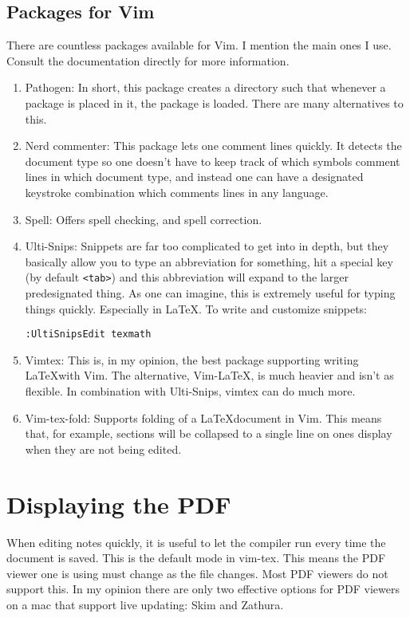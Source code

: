 \documentclass{amsart}
\begin{document}
\subsection{Packages for Vim}

There are countless packages available for Vim. I mention the main ones I use. Consult the
documentation directly for more information.
\begin{enumerate}
\item Pathogen: In short, this package creates a directory such that whenever a package is
placed in it, the package is loaded. There are many alternatives to this. 
\item Nerd commenter: This package lets one comment lines quickly. It detects the document
type so one doesn't have to keep track of which symbols comment lines in which document
type, and instead one can have a designated keystroke combination which comments lines in
any language. 
\item Spell: Offers spell checking, and spell correction.
\item Ulti-Snips: Snippets are far too complicated to get into in depth, but they
basically allow you to type an abbreviation for something, hit a special key (by default
\texttt{<tab>}) and this abbreviation will expand to the larger predesignated thing. As
one can imagine, this is extremely useful for typing things quickly. Especially in \LaTeX.
To write and customize snippets:
\begin{verbatim}
:UltiSnipsEdit texmath
\end{verbatim}
\item Vimtex: This is, in my opinion, the best package supporting writing \LaTeX with Vim.
The alternative, Vim-LaTeX, is much heavier and isn't as flexible. In combination with
Ulti-Snips, vimtex can do much more. 
\item Vim-tex-fold: Supports folding of a \LaTeX document in Vim. This means that, for
example, sections will be collapsed to a single line on ones display when they are not
being edited. 
\end{enumerate}

\section{Displaying the PDF}

When editing notes quickly, it is useful to let the compiler run every time the document
is saved. This is the default mode in vim-tex. This means the PDF viewer one is using must
change as the file changes. Most PDF viewers do not support this. 
In my opinion there are only two effective options for PDF viewers on a mac that support
live updating: Skim and Zathura.
\end{document}
